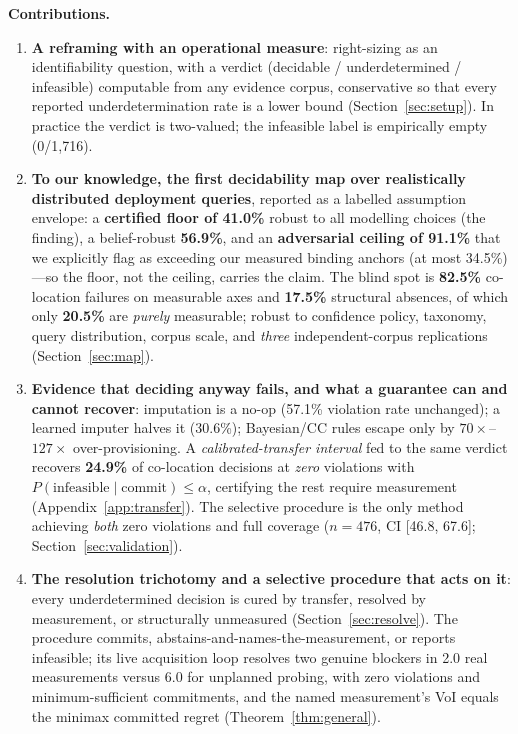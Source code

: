 \documentclass{article} %
\begin{document}
\textbf{Contributions.}
\begin{enumerate}
\item \textbf{A reframing with an operational measure}: right-sizing as an identifiability question, with a verdict (decidable / underdetermined / infeasible) computable from any evidence corpus, conservative so that every reported underdetermination rate is a lower bound (Section~\ref{sec:setup}). In practice the verdict is two-valued; the infeasible label is empirically empty (0/1{,}716).
\item \textbf{To our knowledge, the first decidability map over realistically distributed deployment queries}, reported as a labelled assumption envelope: a \textbf{certified floor of 41.0\%} robust to all modelling choices (the finding), a belief-robust \textbf{56.9\%}, and an \textbf{adversarial ceiling of 91.1\%} that we explicitly flag as exceeding our measured binding anchors (at most 34.5\%)---so the floor, not the ceiling, carries the claim. The blind spot is \textbf{82.5\%} co-location failures on measurable axes and \textbf{17.5\%} structural absences, of which only \textbf{20.5\%} are \emph{purely} measurable; robust to confidence policy, taxonomy, query distribution, corpus scale, and \emph{three} independent-corpus replications (Section~\ref{sec:map}).
\item \textbf{Evidence that deciding anyway fails, and what a guarantee can and cannot recover}: imputation is a no-op (57.1\% violation rate unchanged); a learned imputer halves it (30.6\%); Bayesian/CC rules escape only by $70{\times}$--$127{\times}$ over-provisioning. A \emph{calibrated-transfer interval} fed to the same verdict recovers \textbf{24.9\%} of co-location decisions at \emph{zero} violations with $P(\text{infeasible}\mid\text{commit})\le\alpha$, certifying the rest require measurement (Appendix~\ref{app:transfer}). The selective procedure is the only method achieving \emph{both} zero violations and full coverage ($n{=}476$, CI [46.8, 67.6]; Section~\ref{sec:validation}).
\item \textbf{The resolution trichotomy and a selective procedure that acts on it}: every underdetermined decision is cured by transfer, resolved by measurement, or structurally unmeasured (Section~\ref{sec:resolve}). The procedure commits, abstains-and-names-the-measurement, or reports infeasible; its live acquisition loop resolves two genuine blockers in 2.0 real measurements versus 6.0 for unplanned probing, with zero violations and minimum-sufficient commitments, and the named measurement's VoI equals the minimax committed regret (Theorem~\ref{thm:general}).
\end{enumerate}
\end{document}
